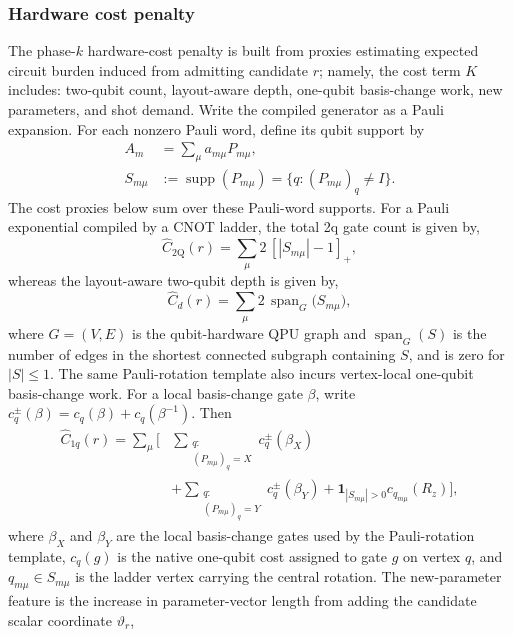 \documentclass[
  reprint,
  amsmath,
  amssymb,
  aps,
  pra,
  nofootinbib,
  superscriptaddress,
  floatfix
]{revtex4-2}
\newcommand{\twq}{\mathrm{2Q}}
\begin{document}
\subsubsection{Hardware cost penalty}

The phase-$k$ hardware-cost penalty is built from proxies estimating expected circuit burden induced from admitting candidate $r$; namely, the cost term $K$ includes: two-qubit count, layout-aware depth, one-qubit basis-change work, new parameters, and shot demand. Write the compiled generator as a Pauli expansion. For each nonzero Pauli word, define its qubit support by
\begin{equation}
\begin{aligned}
A_m&=\sum_{\mu}a_{m\mu}P_{m\mu},\\
S_{m\mu}&:=\operatorname{supp}(P_{m\mu})
=\{q:(P_{m\mu})_q\ne I\}.
\end{aligned}
\label{eq:pauli_word_support}
\end{equation}
The cost proxies below sum over these Pauli-word supports. For a Pauli exponential compiled by a CNOT ladder, the total 2q gate count is given by,
\begin{equation}
\widehat C_{\twq}(r)=\sum_{\mu}2\,[|S_{m\mu}|-1]_+,
\label{eq:pauli_2count_proxy}
\end{equation}
whereas the layout-aware two-qubit depth is given by,
\begin{equation}
\widehat C_d(r)=\sum_{\mu}2\,\operatorname{span}_{G}
\bigl(S_{m\mu}\bigr),
\label{eq:pauli_2depth_proxy}
\end{equation}
where $G=(V,E)$ is the qubit-hardware QPU graph and $\operatorname{span}_{G}(S)$ is the number of edges in the shortest connected subgraph containing $S$, and is zero for $|S|\le1$. The same Pauli-rotation template also incurs vertex-local one-qubit basis-change work. For a local basis-change gate $\beta$, write \(c_q^{\pm}(\beta)=c_q(\beta)+c_q(\beta^{-1})\). Then
\begin{equation}
\begin{aligned}
\widehat C_{1q}(r)
=
\sum_{\mu}
\Bigg[
&\sum_{\substack{q:\\(P_{m\mu})_q=X}}
c_q^{\pm}(\beta_X)\\
&+
\sum_{\substack{q:\\(P_{m\mu})_q=Y}}
c_q^{\pm}(\beta_Y)
+
\mathbf 1_{|S_{m\mu}|>0}c_{q_{m\mu}}(R_z)
\Bigg],
\end{aligned}
\label{eq:pauli_1count_proxy}
\end{equation}
where $\beta_X$ and $\beta_Y$ are the local basis-change gates used by the Pauli-rotation template, $c_q(g)$ is the native one-qubit cost assigned to gate $g$ on vertex $q$, and $q_{m\mu}\in S_{m\mu}$ is the ladder vertex carrying the central rotation. The new-parameter feature is the increase in parameter-vector length from adding the candidate scalar coordinate $\vartheta_r$,
\end{document}
